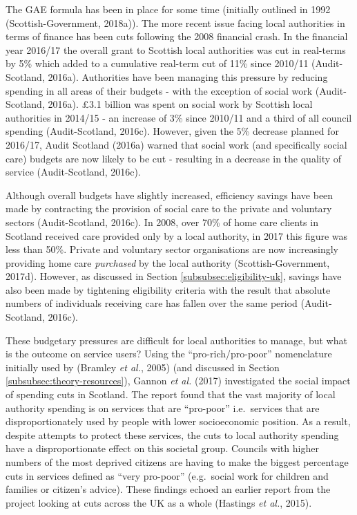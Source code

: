 \documentclass[12pt,a4paper,oneside,table]{report}
\begin{document}
The GAE formula has been in place for some time (initially outlined in
1992 (Scottish-Government, 2018a)). The more recent issue facing local
authorities in terms of finance has been cuts following the 2008
financial crash. In the financial year 2016/17 the overall grant to
Scottish local authorities was cut in real-terms by 5\% which added to a
cumulative real-term cut of 11\% since 2010/11 (Audit-Scotland, 2016a).
Authorities have been managing this pressure by reducing spending in all
areas of their budgets - with the exception of social work
(Audit-Scotland, 2016a). £3.1 billion was spent on social work by
Scottish local authorities in 2014/15 - an increase of 3\% since 2010/11
and a third of all council spending (Audit-Scotland, 2016c). However,
given the 5\% decrease planned for 2016/17, Audit Scotland (2016a)
warned that social work (and specifically social care) budgets are now
likely to be cut - resulting in a decrease in the quality of service
(Audit-Scotland, 2016c).

Although overall budgets have slightly increased, efficiency savings
have been made by contracting the provision of social care to the
private and voluntary sectors (Audit-Scotland, 2016c). In 2008, over
70\% of home care clients in Scotland received care provided only by a
local authority, in 2017 this figure was less than 50\%. Private and
voluntary sector organisations are now increasingly providing home care
\emph{purchased} by the local authority (Scottish-Government, 2017d).
However, as discussed in Section \ref{subsubsec:eligibility-uk}, savings
have also been made by tightening eligibility criteria with the result
that absolute numbers of individuals receiving care has fallen over the
same period (Audit-Scotland, 2016c).

These budgetary pressures are difficult for local authorities to manage,
but what is the outcome on service users? Using the
``pro-rich/pro-poor'' nomenclature initially used by (Bramley \emph{et
al.}, 2005) (and discussed in Section \ref{subsubsec:theory-resources}),
Gannon \textit{et al.} (2017) investigated the social impact of spending
cuts in Scotland. The report found that the vast majority of local
authority spending is on services that are ``pro-poor'' i.e.~services
that are disproportionately used by people with lower socioeconomic
position. As a result, despite attempts to protect these services, the
cuts to local authority spending have a disproportionate effect on this
societal group. Councils with higher numbers of the most deprived
citizens are having to make the biggest percentage cuts in services
defined as ``very pro-poor'' (e.g.~social work for children and families
or citizen's advice). These findings echoed an earlier report from the
project looking at cuts across the UK as a whole (Hastings \emph{et
al.}, 2015).
\end{document}
